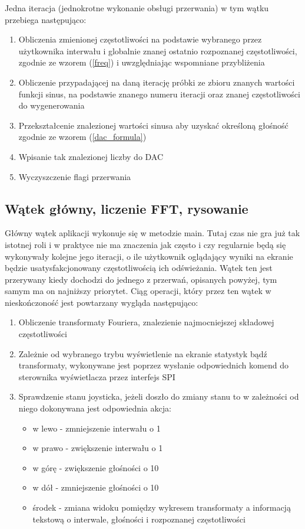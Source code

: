 Jedna iteracja (jednokrotne wykonanie obsługi przerwania) w tym wątku przebiega następująco:
\begin{enumerate}
    \item Obliczenia zmienionej częstotliwości na podstawie wybranego przez użytkownika interwału i globalnie znanej ostatnio rozpoznanej częstotliwości, zgodnie ze wzorem (\ref{freq}) i uwzględniając wspomniane przybliżenia
    \item Obliczenie przypadającej na daną iterację próbki ze zbioru znanych wartości funkcji sinus, na podstawie znanego numeru iteracji oraz znanej częstotliwości do wygenerowania
    \item Przekształcenie znalezionej wartości sinusa aby uzyskać określoną głośność zgodnie ze wzorem (\ref{dac_formula})
    \item Wpisanie tak znalezionej liczby do DAC
    \item Wyczyszczenie flagi przerwania
\end{enumerate}

\subsection{Wątek główny, liczenie FFT, rysowanie} \label{zasada_dzialania_watek_glowny}
Główny wątek aplikacji wykonuje się w metodzie main. Tutaj czas nie gra już tak istotnej roli i w praktyce nie ma znaczenia jak często i czy regularnie będą się wykonywały kolejne jego iteracji, o ile użytkownik oglądający wyniki na ekranie będzie usatysfakcjonowany częstotliwością ich odświeżania. Wątek ten jest przerywany kiedy dochodzi do jednego z przerwań, opisanych powyżej, tym samym ma on najniższy priorytet. Ciąg operacji, który przez ten wątek w nieskończoność jest powtarzany wygląda następująco:
\begin{enumerate}
    \item Obliczenie transformaty Fouriera, znalezienie najmocniejszej składowej częstotliwości
    \item Zależnie od wybranego trybu wyświetlenie na ekranie statystyk bądź transformaty, wykonywane jest poprzez wysłanie odpowiednich komend do sterownika wyświetlacza przez interfejs SPI
    \item Sprawdzenie stanu joysticka, jeżeli doszło do zmiany stanu to w zależności od niego dokonywana jest odpowiednia akcja:
        \begin{itemize}
            \item w lewo - zmniejszenie interwału o 1
            \item w prawo - zwiększenie interwału o 1
            \item w górę - zwiększenie głośności o 10
            \item w dół - zmniejszenie głośności o 10
            \item środek - zmiana widoku pomiędzy wykresem transformaty a informacją tekstową o interwale, głośności i rozpoznanej częstotliwości
        \end{itemize}
\end{enumerate}

